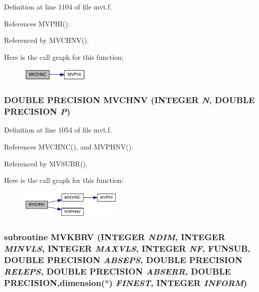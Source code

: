 Definition at line 1104 of file mvt.f.

References MVPHI().

Referenced by MVCHNV().

Here is the call graph for this function:\nopagebreak
\begin{figure}[H]
\begin{center}
\leavevmode
\includegraphics[width=93pt]{mvt_8f_81b566eaa4178de04b31e15475cde3bf_cgraph}
\end{center}
\end{figure}
\hypertarget{mvt_8f_3652f2cb737bf864d78fff1a650ca287}{
\subsubsection[{MVCHNV}]{\setlength{\rightskip}{0pt plus 5cm}DOUBLE PRECISION MVCHNV (INTEGER {\em N}, \/  DOUBLE PRECISION {\em P})}}
\label{mvt_8f_3652f2cb737bf864d78fff1a650ca287}




Definition at line 1054 of file mvt.f.

References MVCHNC(), and MVPHNV().

Referenced by MVSUBR().

Here is the call graph for this function:\nopagebreak
\begin{figure}[H]
\begin{center}
\leavevmode
\includegraphics[width=140pt]{mvt_8f_3652f2cb737bf864d78fff1a650ca287_cgraph}
\end{center}
\end{figure}
\hypertarget{mvt_8f_53a2e447659c04eb0ad551cf58c77d37}{
\subsubsection[{MVKBRV}]{\setlength{\rightskip}{0pt plus 5cm}subroutine MVKBRV (INTEGER {\em NDIM}, \/  INTEGER {\em MINVLS}, \/  INTEGER {\em MAXVLS}, \/  INTEGER {\em NF}, \/  FUNSUB, \/  DOUBLE PRECISION {\em ABSEPS}, \/  DOUBLE PRECISION {\em RELEPS}, \/  DOUBLE PRECISION {\em ABSERR}, \/  DOUBLE PRECISION,dimension($\ast$) {\em FINEST}, \/  INTEGER {\em INFORM})}}
\label{mvt_8f_53a2e447659c04eb0ad551cf58c77d37}




